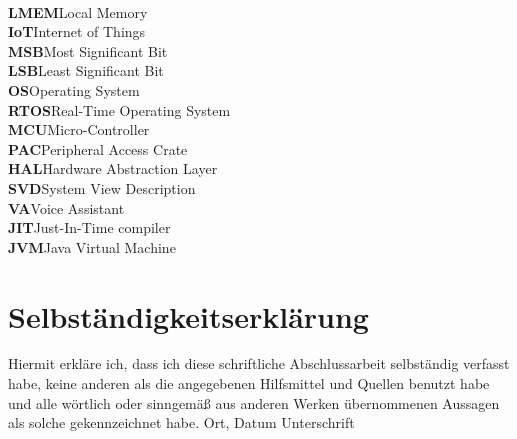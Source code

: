\documentclass[oneside,11pt,a4paper,twoside]{scrreprt}
\begin{document}
\begin{tabbing}
\\
\textbf{LMEM}\>Local Memory
\\
\textbf{IoT}\>Internet of Things
\\
\textbf{MSB}\>Most Significant Bit
\\
\textbf{LSB}\>Least Significant Bit
\\
\textbf{OS}\>Operating System
\\
\textbf{RTOS}\>Real-Time Operating System
\\
\textbf{MCU}\>Micro-Controller
\\
\textbf{PAC}\>Peripheral Access Crate
\\
\textbf{HAL}\>Hardware Abstraction Layer
\\
\textbf{SVD}\>System View Description
\\
\textbf{VA}\>Voice Assistant
\\
\textbf{JIT}\>Just-In-Time compiler
\\
\textbf{JVM}\>Java Virtual Machine
\end{tabbing}
\cleardoublepage

\small\normalsize
{}
\listoffigures
\small\normalsize
\cleardoublepage

\small\normalsize
{}
\listoftables
\small\normalsize
\cleardoublepage

\thispagestyle{empty}
\section*{Selbständigkeitserklärung}
Hiermit erkläre ich, dass ich diese schriftliche Abschlussarbeit selbständig verfasst habe, keine anderen als die angegebenen Hilfsmittel und Quellen benutzt habe und alle wörtlich oder sinngemä{\ss} aus anderen Werken übernommenen Aussagen als solche gekennzeichnet habe.
\vskip 3cm
Ort, Datum	\hfill Unterschrift \hfill
\end{document}

